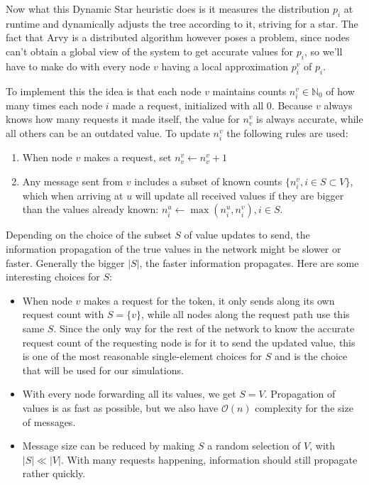 \documentclass[a4paper, oneside]{discothesis}
\begin{document}
Now what this Dynamic Star heuristic does is it measures the distribution $p_i$ at runtime and dynamically adjusts the tree according to it, striving for a star. The fact that Arvy is a distributed algorithm however poses a problem, since nodes can't obtain a global view of the system to get accurate values for $p_i$, so we'll have to make do with every node $v$ having a local approximation $p_i^v$ of $p_i$.

To implement this the idea is that each node $v$ maintains counts $n_i^v\in\mathbb{N}_0$ of how many times each node $i$ made a request, initialized with all $0$. Because $v$ always knows how many requests it made itself, the value for $n_v^v$ is always accurate, while all others can be an outdated value. To update $n_i^v$ the following rules are used:
\begin{enumerate}
\item When node $v$ makes a request, set $n_v^v\gets n_v^v+1$
\label{rule1}
\item Any message sent from $v$ includes a subset of known counts $\{n_i^v,i\in S\subset V\}$, which when arriving at $u$ will update all received values if they are bigger than the values already known: $n_i^u\gets \max(n_i^u,n_i^v),i\in S$.
\end{enumerate}

Depending on the choice of the subset $S$ of value updates to send, the information propagation of the true values in the network might be slower or faster. Generally the bigger $|S|$, the faster information propagates. Here are some interesting choices for $S$:
\begin{itemize}
\item When node $v$ makes a request for the token, it only sends along its own request count with $S=\{v\}$, while all nodes along the request path use this same $S$. Since the only way for the rest of the network to know the accurate request count of the requesting node is for it to send the updated value, this is one of the most reasonable single-element choices for $S$ and is the choice that will be used for our simulations.
\item With every node forwarding all its values, we get $S=V$. Propagation of values is as fast as possible, but we also have $\mathcal{O}(n)$ complexity for the size of messages.
\item Message size can be reduced by making $S$ a random selection of $V$, with $|S|\ll|V|$. With many requests happening, information should still propagate rather quickly.
\end{itemize}
\end{document}
